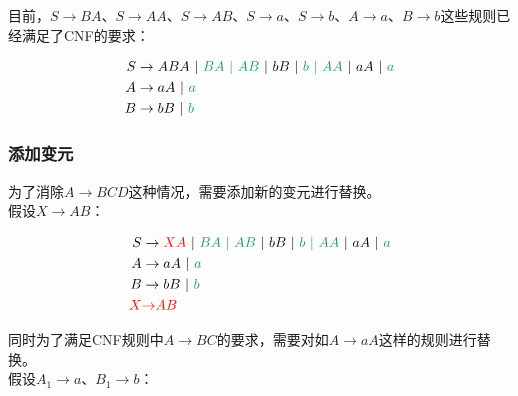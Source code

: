 目前，$ S \rightarrow BA $、$ S \rightarrow AA $、$ S \rightarrow AB $、$ S \rightarrow a $、$ S \rightarrow b $、$ A \rightarrow a $、$ B \rightarrow b $这些规则已经满足了CNF的要求：

\vspace{-1cm}

\begin{align*}
    S & \rightarrow ABA\ |\ \textcolor{ForestGreen}{BA\ |\ AB}\ |\ bB\ |\ \textcolor{ForestGreen}{b\ |\ AA}\ |\ aA\ |\ \textcolor{ForestGreen}{a} \\
    A & \rightarrow aA\ |\ \textcolor{ForestGreen}{a}                                                                                             \\
    B & \rightarrow bB\ |\ \textcolor{ForestGreen}{b}
\end{align*}

\subsubsection{添加变元}

为了消除$ A \rightarrow BCD $这种情况，需要添加新的变元进行替换。\\

假设$ X \rightarrow AB $：

\vspace{-1cm}

\begin{align*}
    S                  & \rightarrow \textcolor{red}{XA}\ |\ \textcolor{ForestGreen}{BA\ |\ AB}\ |\ bB\ |\ \textcolor{ForestGreen}{b\ |\ AA}\ |\ aA\ |\ \textcolor{ForestGreen}{a} \\
    A                  & \rightarrow aA\ |\ \textcolor{ForestGreen}{a}                                                                                                             \\
    B                  & \rightarrow bB\ |\ \textcolor{ForestGreen}{b}                                                                                                             \\
    \textcolor{red}{X} & \textcolor{red}{\rightarrow} \textcolor{red}{AB}
\end{align*}

同时为了满足CNF规则中$ A \rightarrow BC $的要求，需要对如$ A \rightarrow aA $这样的规则进行替换。\\

假设$ A_1 \rightarrow a $、$ B_1 \rightarrow b $：

